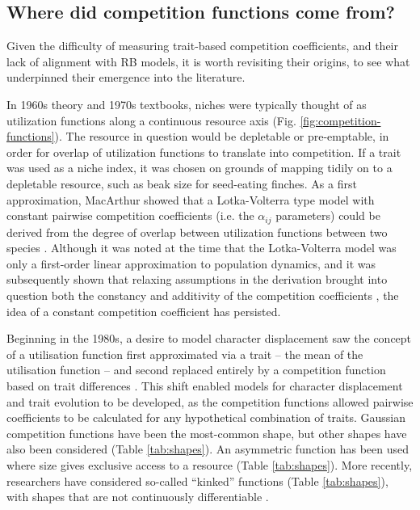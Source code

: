 \documentclass[a4paper,11pt]{article}
\begin{document}
\subsection{Where did competition functions come from?}

Given the difficulty of measuring trait-based competition coefficients, and their lack of alignment with RB models, it is worth revisiting their origins, to see what underpinned their emergence into the literature.

In 1960s theory and 1970s textbooks, niches were typically thought of as utilization functions along a continuous resource axis \citep{MacArthur-1967} (Fig. \ref{fig:competition-functions}). The resource in question would be depletable or pre-emptable, in order for overlap of utilization functions to translate into competition. If a trait was used as a niche index, it was chosen on grounds of mapping tidily on to a depletable resource, such as beak size for seed-eating finches. As a first approximation, MacArthur \citet{MacArthur-1967, MacArthur-1970} showed that a Lotka-Volterra type model with constant pairwise competition coefficients (i.e. the $\alpha_{ij}$ parameters) could be derived from the degree of overlap between utilization functions between two species \citep{MacArthur-1967, May-1972, Abrams-1975}. Although it was noted at the time that the Lotka-Volterra model was only a first-order linear approximation to population dynamics, and it was subsequently shown that relaxing assumptions in the derivation brought into question both the constancy and additivity of the competition coefficients \citep{Abrams-1980, Letten-2019}, the idea of a constant competition coefficient has persisted.

Beginning in the 1980s, a desire to model character displacement saw the concept of a utilisation function first approximated via a trait -- the mean of the utilisation function \citep{Roughgarden-1979} -- and second replaced entirely by a competition function based on trait differences \citep{Slatkin-1980,Taper-1985}. This shift enabled models for character displacement \citep[e.g.,][]{Taper-1985, Case-2000, Goldberg-2006} and trait evolution \citep{Brown-1987, Geritz-1998, Geritz-1999, Dieckmann-1999, Abrams-2001} to be developed, as the competition functions allowed pairwise coefficients to be calculated for any hypothetical combination of traits. Gaussian competition functions have been the most-common shape, but other shapes have also been considered (Table \ref{tab:shapes}). An asymmetric function has been used where size gives exclusive access to a resource \citep[e.g.][]{Law-1997, Kisdi-1999, Geritz-1999, Egas-2004, Calcagno-2006, DAndrea-2013} (Table \ref{tab:shapes}). More recently, researchers have considered so-called ``kinked'' functions (Table \ref{tab:shapes}), with shapes that are not continuously differentiable \citep{Calcagno-2006, Scheffer-2006, Pigolotti-2007, Leimar-2013, Barabas-2013}. 
\end{document}

